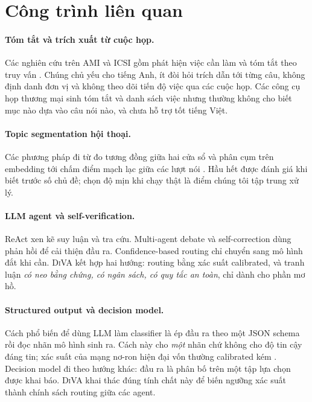 \documentclass[11pt]{article}
\newcommand{\diva}{\textsc{DiVA}}
\begin{document}
\section{Công trình liên quan}

\paragraph{Tóm tắt và trích xuất từ cuộc họp.} Các nghiên cứu trên AMI và ICSI
\citep{carletta2005ami,janin2003icsi} gồm phát hiện việc cần làm \citep{purver2007actionitems} và tóm tắt
theo truy vấn \citep{zhong2021qmsum}. Chúng chủ yếu cho tiếng Anh, ít đòi hỏi trích dẫn tới từng câu,
không định danh đơn vị và không theo dõi tiến độ việc qua các cuộc họp. Các công cụ họp thương mại sinh
tóm tắt và danh sách việc nhưng thường không cho biết mục nào dựa vào câu nói nào, và chưa hỗ trợ tốt
tiếng Việt.

\paragraph{Topic segmentation hội thoại.} Các phương pháp đi từ đo tương đồng giữa hai cửa sổ
\citep{hearst1997texttiling} và phân cụm trên embedding \citep{gklezakos2024treeseg} tới chấm điểm mạch
lạc giữa các lượt nói \citep{xing2021coherence,gao2023dialstart}. Hầu hết được đánh giá khi biết trước số
chủ đề; chọn độ mịn khi chạy thật là điểm chúng tôi tập trung xử lý.

\paragraph{LLM agent và self-verification.} ReAct \citep{yao2023react} xen kẽ suy luận và tra cứu. Multi-agent debate \citep{du2023debate,liang2023divergent} và self-correction \citep{madaan2023selfrefine,gou2024critic}
dùng phản hồi để cải thiện đầu ra. Confidence-based routing
\citep{geifman2017selective,chen2023frugalgpt} chỉ chuyển sang mô hình đắt khi cần. \diva{} kết hợp hai
hướng: routing bằng xác suất calibrated, và tranh luận \emph{có neo bằng chứng, có ngân sách,
có quy tắc an toàn}, chỉ dành cho phần mơ hồ.

\paragraph{Structured output và decision model.} Cách phổ biến để dùng LLM làm classifier là ép
đầu ra theo một JSON schema rồi đọc nhãn mô hình sinh ra. Cách này cho \emph{một} nhãn chứ không cho độ tin
cậy đáng tin; xác suất của mạng nơ-ron hiện đại vốn thường calibrated kém \citep{guo2017calibration}.
Decision model đi theo hướng khác: đầu ra là phân bố trên một tập lựa chọn được khai báo. \diva{} khai
thác đúng tính chất này để biến ngưỡng xác suất thành chính sách routing giữa các agent.
\end{document}
